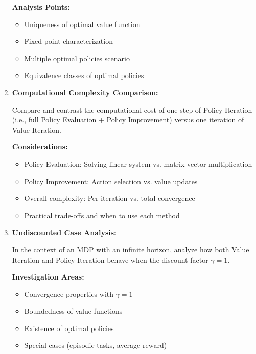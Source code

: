 \documentclass[12pt]{article}
\begin{document}
\begin{enumerate}[resume*]
    \textbf{Analysis Points:}
    \begin{itemize}
        \item Uniqueness of optimal value function
        \item Fixed point characterization
        \item Multiple optimal policies scenario
        \item Equivalence classes of optimal policies
    \end{itemize}

    \item \textbf{Computational Complexity Comparison:}
    
    Compare and contrast the computational cost of one step of Policy Iteration (i.e., full Policy Evaluation + Policy Improvement) versus one iteration of Value Iteration.
    
    \textbf{Considerations:}
    \begin{itemize}
        \item Policy Evaluation: Solving linear system vs. matrix-vector multiplication
        \item Policy Improvement: Action selection vs. value updates
        \item Overall complexity: Per-iteration vs. total convergence
        \item Practical trade-offs and when to use each method
    \end{itemize}

    \item \textbf{Undiscounted Case Analysis:}
    
    In the context of an MDP with an infinite horizon, analyze how both Value Iteration and Policy Iteration behave when the discount factor \( \gamma = 1 \).
    
    \textbf{Investigation Areas:}
    \begin{itemize}
        \item Convergence properties with \( \gamma = 1 \)
        \item Boundedness of value functions
        \item Existence of optimal policies
        \item Special cases (episodic tasks, average reward)
    \end{itemize}



\end{enumerate}
\end{document}
